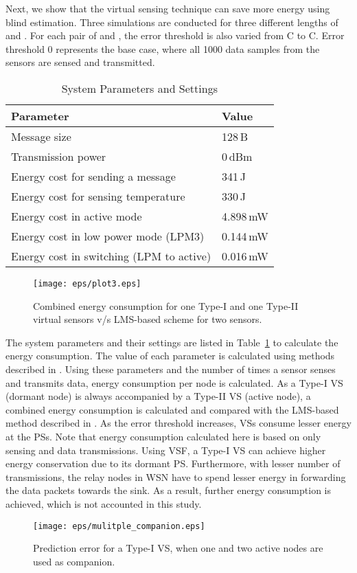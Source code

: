 \documentclass[a4paper,conference]{IEEEtran}
\begin{document}
Next, we show that the virtual sensing technique can save more energy using blind estimation. Three simulations are conducted for three different lengths of  and . For each pair of  and , the error threshold is also varied from C to C. Error threshold 0 represents the base case, where all 1000 data samples from the sensors are sensed and transmitted. 
\begin{table}
\centering
\caption{System Parameters and Settings}
\begin{tabular}{|l|l|} \hline
\textbf{Parameter} & \textbf{Value} \\ \hline
Message size & 128\,B \\ \hline
Transmission power & 0\,dBm \\ \hline
Energy cost for sending a message & 341\,J \\ \hline
Energy cost for sensing temperature & 330\,J \\ \hline
Energy cost in active mode & 4.898\,mW \\ \hline
Energy cost in low power mode (LPM3) & 0.144\,mW \\ \hline
Energy cost in switching (LPM to active) & 0.016\,mW \\
\hline\end{tabular}
\label{settings}
\end{table}
\begin{figure}[]
\centering
\texttt{[image: eps/plot3.eps]}
\caption{Combined energy consumption for one Type-I and one Type-II virtual sensors v/s LMS-based scheme for two sensors.}
\label{fig:energy}
\end{figure}

The system parameters and their settings are listed in Table~\ref{settings} to calculate the energy consumption. The value of each parameter is calculated using methods described in \cite{amiri2010measurements,prabhakar2012zen}. Using these parameters and the number of times a sensor senses and transmits data, energy consumption per node is calculated. As a Type-I VS (dormant node) is always accompanied by a Type-II VS (active node), a combined energy consumption is calculated and compared with the LMS-based method described in \cite{santini2006adaptive}. As the error threshold increases, VSs consume lesser energy at the PSs. Note that energy consumption calculated here is based on only sensing and data transmissions. Using VSF, a Type-I VS can achieve higher energy conservation due to its dormant PS. Furthermore, with lesser number of transmissions, the relay nodes in WSN have to spend lesser energy in forwarding the data packets towards the sink. As a result, further energy consumption is achieved, which is not accounted in this study.
\begin{figure}
\centering
\texttt{[image: eps/mulitple\_companion.eps]}
\caption{Prediction error for a Type-I VS, when one and two active nodes are used as companion.}
\label{fig:multi}
\end{figure}
\end{document}
